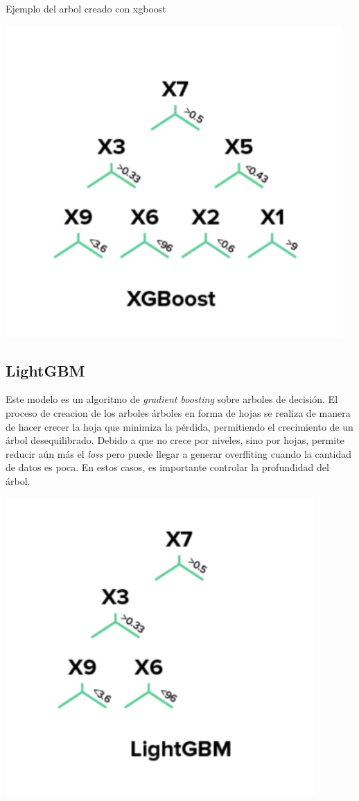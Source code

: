 \documentclass[12pt,a4paper]{article}
\begin{document}
Ejemplo del arbol creado con xgboost
\begin{center}
    \includegraphics[scale=0.5]{imgs/xgb.png}
\end{center}


\subsection{LightGBM}
Este modelo es un algoritmo de \textit{gradient boosting} sobre arboles de decisión. El proceso de creacion de los arboles árboles en forma de hojas se realiza de manera de hacer crecer la hoja que minimiza la pérdida, permitiendo el crecimiento de un árbol desequilibrado. Debido a que no crece por niveles, sino por hojas, permite reducir aún más el \textit{loss} pero puede llegar a generar overffiting cuando la cantidad de datos es poca. En estos casos, es importante controlar la profundidad del árbol.

\begin{center}
    \includegraphics[scale=0.5]{imgs/lightgbm.png}
\end{center}
\end{document}
